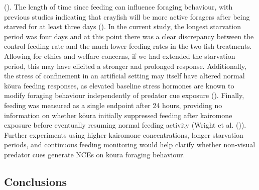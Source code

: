 \documentclass[
  letterpaper,
  DIV=11,
  numbers=noendperiod]{scrartcl}
\begin{document}
(). The length of time since
feeding can influence foraging behaviour, with previous studies
indicating that crayfish will be more active foragers after being
starved for at least three days (). In the current study, the longest starvation period was four
days and at this point there was a clear discrepancy between the control
feeding rate and the much lower feeding rates in the two fish
treatments. Allowing for ethics and welfare concerns, if we had extended
the starvation period, this may have elicited a stronger and prolonged
response. Additionally, the stress of confinement in an artificial
setting may itself have altered normal kōura feeding responses, as
elevated baseline stress hormones are known to modify foraging behaviour
independently of predator cue exposure
(). Finally, feeding was
measured as a single endpoint after 24 hours, providing no information
on whether kōura initially suppressed feeding after kairomone exposure
before eventually resuming normal feeding activity (Wright et al.
()). Further experiments using higher
kairomone concentrations, longer starvation periods, and continuous
feeding monitoring would help clarify whether non-visual predator cues
generate NCEs on kōura foraging behaviour.

\subsection{Conclusions}\label{conclusions}
\end{document}
